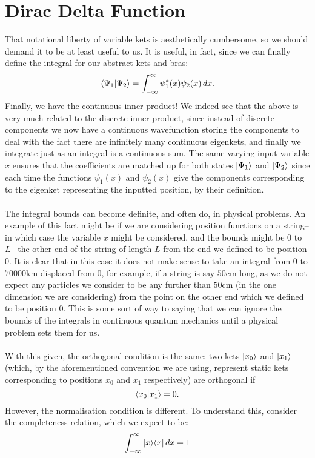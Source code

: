 \section{Dirac Delta Function}
That notational liberty of variable kets is aesthetically cumbersome, so we should demand it to be at least useful to us. It is useful, in fact, since we can finally define the integral for our abstract kets and bras:
$$
\langle\Psi_{1}|\Psi_{2}\rangle=\int_{-\infty}^{\infty}\psi_{1}^{\ast}(x)\psi_{2}(x)\,dx .
$$
Finally, we have the continuous inner product! We indeed see that the above is very much related to the discrete inner product, since instead of discrete components we now have a continuous wavefunction storing the components to deal with the fact there are infinitely many continuous eigenkets, and finally we integrate just as an integral is a continuous sum. The same varying input variable $x$ ensures that the coefficients are matched up for both states $|\Psi_{1}\rangle$ and $|\Psi_{2}\rangle$ since each time the functions $\psi_{1}(x)$ and $\psi_{2}(x)$ give the components corresponding to the eigenket representing the inputted position, by their definition.
\\\\
The integral bounds can become definite, and often do, in physical problems. An example of this fact might be if we are considering position functions on a string-- in which case the variable $x$ might be considered, and the bounds might be $0$ to $L$-- the other end of the string of length $L$ from the end we defined to be position $0$. It is clear that in this case it does not make sense to take an integral from $0$ to $70000$km displaced from $0$, for example, if a string is say $50$cm long, as we do not expect any particles we consider to be any further than $50$cm (in the one dimension we are considering) from the point on the other end which we defined to be position $0$. This is some sort of way to saying that we can ignore the bounds of the integrals in continuous quantum mechanics until a physical problem sets them for us.
\\\\
With this given, the orthogonal condition is the same: two kets $|x_{0}\rangle$ and $|x_{1}\rangle$ (which, by the aforementioned convention we are using, represent static kets corresponding to positions $x_{0}$ and $x_{1}$ respectively) are orthogonal if 
$$
\langle x_{0}|x_{1}\rangle=0.
$$
However, the normalisation condition is different. To understand this, consider the completeness relation, which we expect to be:
$$
\int_{-\infty}^{\infty} |x\rangle\langle x|\,dx=1
$$
